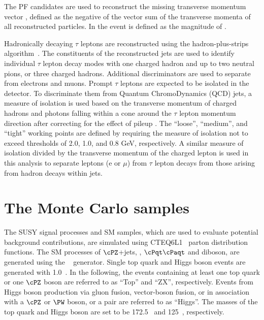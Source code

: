 The PF candidates are used to reconstruct the missing transverse momentum  vector \ptvecmiss, defined as the negative of the vector sum of the transverse momenta of all reconstructed particles.  
In the event \MPT is defined as the magnitude of \ptvecmiss.

Hadronically decaying $\tau$ leptons are reconstructed using the hadron-plus-strips algorithm~\cite{Khachatryan:2015dfa}.
The constituents of the reconstructed jets are used to identify individual $\tau$ lepton decay modes with one charged 
hadron and up to two neutral pions, or three charged hadrons. 
Additional discriminators are used to separate \Tau from electrons and muons.
Prompt $\tau$ leptons are expected to be isolated in the detector.
To discriminate them from Quantum ChromoDynamics (QCD) jets, a measure of isolation is used 
based on the transverse momentum of charged hadrons and photons falling within 
a cone around the $\tau$ lepton momentum direction after correcting for the effect of
pileup \cite{Khachatryan:2014wca}. The ``loose'', ``medium'', and ``tight'' working points are defined
by requiring the measure of isolation not to exceed thresholds of 2.0, 1.0,
and 0.8 GeV, respectively.
 A similar measure of isolation divided by the transverse momentum of the charged lepton is 
used in this analysis to separate leptons (e or $\mu$) from $\tau$ lepton decays from 
those arising from hadron decays within jets.

\section{The Monte Carlo samples}
\label{sect:MCSamples}
The SUSY signal processes and SM samples, which are used to evaluate potential background contributions, are simulated using CTEQ6L1~\cite{Nadolsky:2008zw} parton distribution functions. The SM processes of $\cPZ$+jets, \wjets, $\cPqt\cPaqt$ and diboson, are generated using the ~\cite{Alwall:2011uj} generator. 
Single top quark and Higgs boson events are generated with {\POWHEG} 1.0~\cite{Nason:2004rx,Frixione:2007vw,Alioli:2009je,Alioli:2010xd}.
In the following, the events containing at least one top quark or one $\cPZ$ boson are referred to as ``Top'' and ``ZX'', respectively. 
Events from Higgs boson production via gluon fusion, vector-boson fusion, or in association with a $\cPZ$ or $\PW$ boson, or a \ttbar pair are referred to as ``Higgs''. The masses of the top quark and Higgs boson are set to be 172.5\GeV~\cite{Khachatryan:2015hba} and 125\GeV~\cite{Aad:2015zhl}, respectively. 


